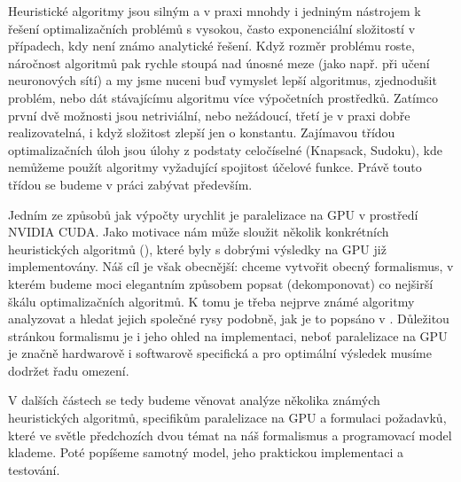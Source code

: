 

Heuristické algoritmy jsou silným a v praxi mnohdy i jedniným nástrojem k řešení optimalizačních problémů s vysokou, často exponenciální složitostí v případech, kdy není známo analytické řešení. Když rozměr problému roste, náročnost algoritmů pak rychle stoupá nad únosné meze (jako např. při učení neuronových sítí) a my jsme nuceni buď vymyslet lepší algoritmus, zjednodušit problém, nebo dát stávajícímu algoritmu více výpočetních prostředků. Zatímco první dvě možnosti jsou netriviální, nebo nežádoucí, třetí je v praxi dobře realizovatelná, i když složitost zlepší jen o konstantu. Zajímavou třídou optimalizačních úloh  jsou úlohy z podstaty celočíselné (Knapsack, Sudoku), kde nemůžeme použít algoritmy vyžadující spojitost účelové funkce. Právě touto třídou se budeme v práci zabývat především.


Jedním ze způsobů jak výpočty urychlit je paralelizace na GPU v prostředí NVIDIA CUDA. Jako motivace nám může sloužit několik konkrétních heuristických algoritmů (), které byly s dobrými výsledky na GPU již implementovány. Náš cíl je však obecnější: chceme vytvořit obecný formalismus, v kterém budeme moci elegantním způsobem popsat (dekomponovat) co nejširší škálu optimalizačních algoritmů. K tomu je třeba nejprve známé algoritmy analyzovat a hledat jejich společné rysy podobně, jak je to popsáno v \cite{GO ebook}. Důležitou stránkou formalismu je i jeho ohled na implementaci, neboť paralelizace na GPU je značně hardwarově i softwarově specifická a pro optimální výsledek musíme dodržet řadu omezení.



V dalších částech se tedy budeme věnovat analýze několika známých heuristických algoritmů, specifikům paralelizace na GPU a formulaci požadavků, které ve světle předchozích dvou témat na náš formalismus a programovací model klademe. Poté popíšeme samotný model, jeho praktickou implementaci a testování. 